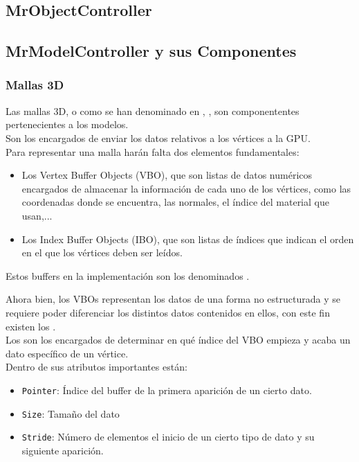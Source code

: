 \subsection{MrObjectController}

\subsection{MrModelController y sus Componentes}
\subsubsection{Mallas 3D}
Las mallas 3D, o como se han denominado en \robotto, \rorefmesh, son componententes pertenecientes a los modelos.\\
Son los encargados de enviar los datos relativos a los vértices a la GPU.\\
Para representar una malla harán falta dos elementos fundamentales:

\begin{itemize}
\item Los Vertex Buffer Objects (VBO), que son listas de datos numéricos encargados de almacenar la información de cada uno de los vértices, como las coordenadas donde se encuentra, las normales, el índice del material que usan,...
\item Los Index Buffer Objects (IBO), que son listas de índices que indican el orden en el que los vértices deben ser leídos.
\end{itemize}

Estos buffers en la implementación son los denominados \rorefbuffer.

Ahora bien, los VBOs representan los datos de una forma no estructurada y se requiere poder diferenciar los distintos datos contenidos en ellos, con este fin existen los \rorefbufferkey.\\
Los \rorefbufferkey son los encargados de determinar en qué índice del VBO empieza y acaba un dato específico de un vértice.\\
Dentro de sus atributos importantes están:
\begin{itemize}
\item \texttt{Pointer}: Índice del buffer de la primera aparición de un cierto dato.
\item \texttt{Size}: Tamaño del dato
\item \texttt{Stride}: Número de elementos el inicio de un cierto tipo de dato y su siguiente aparición.
\end{itemize}

